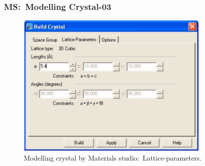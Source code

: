 \frame
{
	\frametitle{\textrm{MS:~Modelling Crystal-03}}
\begin{figure}[h!]
\centering
\vspace*{-0.15in}
\includegraphics[height=2.75in,width=3.70in,viewport=0 0 818 616,clip]{Figures/MS-New_Project-08.png}
\caption{\tiny \textrm{Modelling crystal by Materials studio:~Lattice-parameters.}}%
\label{MS-Modelling-Crystal-03}
\end{figure}
}

